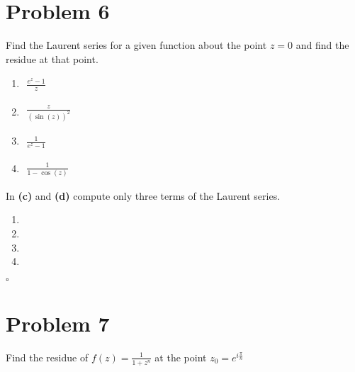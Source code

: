 \documentclass[12pt]{article}
\newenvironment{proof}{\noindent{\bf Proof.}}{\hfill $\square$\medskip}
\begin{document}
\newpage
\section{Problem 6}
Find the Laurent series for a given function about the point $z=0$ and find the residue at that point.

\begin{enumerate}[label=\textbf{(\alph*)}]
    \item
          \begin{flushleft}
              $\begin{aligned}
                      \frac{e^{z}-1}{z}
                  \end{aligned}$
          \end{flushleft}
    \item
          \begin{flushleft}
              $\begin{aligned}
                      \frac{z}{(\sin(z))^{2}}
                  \end{aligned}$
          \end{flushleft}
    \item
          \begin{flushleft}
              $\begin{aligned}
                      \frac{1}{e^{z}-1}
                  \end{aligned}$
          \end{flushleft}
    \item
          \begin{flushleft}
              $\begin{aligned}
                      \frac{1}{1-\cos(z)}
                  \end{aligned}$
          \end{flushleft}
\end{enumerate}
In \textbf{(c)} and \textbf{(d)} compute only three terms of the Laurent series.

\begin{proof}
    \begin{enumerate}[label=\textbf{(\alph*)}]
        \item
        \item
        \item
        \item
    \end{enumerate}
\end{proof}


\newpage
\section{Problem 7}
Find the residue of $f(z)=\frac{1}{1+z^{n}}$ at the point $z_{0}=e^{i\frac{\pi}{n}}$
\end{document}
